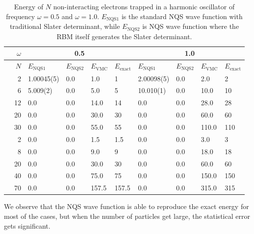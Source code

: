 \begin{table} [H]
	\caption{Energy of $N$ non-interacting electrons trapped in a harmonic oscillator of frequency $\omega=0.5$ and $\omega=1.0$. $E_{\text{NQS1}}$ is the standard NQS wave function with traditional Slater determinant, while $E_{\text{NQS2}}$ is NQS wave function where the RBM itself generates the Slater determinant. }
	\label{tab:quantumdotswointeraction}
	\begin{tabularx}{\textwidth}{r|r|XXXX:XXXX} \hline\hline
		\label{tab:nn}
		& $\omega$ & &\\ \hline
		& $N$ & $E_{\text{NQS1}}$ & $E_{\text{NQS2}}$ & $E_{\text{VMC}}$ & $E_{\text{exact}}$ & $E_{\text{NQS1}}$ & $E_{\text{NQS2}}$ & $E_{\text{VMC}}$ & $E_{\text{exact}}$ \\ \hline
		
		\parbox[t]{2mm}{}
		&2 & 1.00045(5) & 0.0 & 1.0 & 1 & 2.00098(5) & 0.0 & 2.0 & 2\\
		&6 & 5.009(2) & 0.0 & 5.0 & 5 & 10.010(1) & 0.0 & 10.0 & 10 \\
		&12 & 0.0 & 0.0 & 14.0 & 14 & 0.0 & 0.0 & 28.0 & 28\\
		&20 & 0.0 & 0.0 & 30.0 & 30 & 0.0 & 0.0 & 60.0 & 60\\
		&30 & 0.0 & 0.0 & 55.0 & 55 & 0.0 & 0.0 & 110.0 & 110\\ \hline
		
		\parbox[t]{2mm}{}
		&2 & 0.0 & 0.0 & 1.5 & 1.5 & 0.0 & 0.0 & 3.0 & 3 \\
		&8 & 0.0 & 0.0 & 9.0 & 9 & 0.0 & 0.0 & 18.0 & 18 \\
		&20 & 0.0 & 0.0 & 30.0 & 30 & 0.0 & 0.0 & 60.0 & 60 \\
		&40 & 0.0 & 0.0 & 75.0 & 75 & 0.0 & 0.0 & 150.0 & 150 \\
		&70 & 0.0 & 0.0 & 157.5 & 157.5 & 0.0 & 0.0 & 315.0 & 315 \\ \hline\hline
	\end{tabularx}
\end{table}
We observe that the NQS wave function is able to reproduce the exact energy for most of the cases, but when the number of particles get large, the statistical error gets significant.

